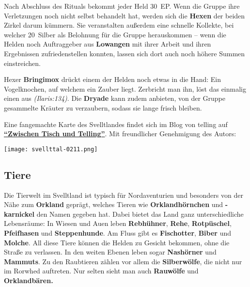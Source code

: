 
Nach Abschluss des Rituals bekommt jeder Held 30~EP.
Wenn die Gruppe ihre Verletzungen noch nicht selbst behandelt hat, werden sich die \textbf{Hexen} der beiden Zirkel darum kümmern.
Sie veranstalten außerdem eine schnelle Kollekte, bei welcher 20~Silber als Belohnung für die Gruppe herauskommen -- wenn die Helden noch Auftraggeber aus \textbf{Lowangen} mit ihrer Arbeit und ihren Ergebnissen zufriedenstellen konnten, lassen sich dort auch noch höhere Summen einstreichen. 
\begin{center}
\end{center}
Hexer \textbf{Bringimox} drückt einem der Helden noch etwas in die Hand:
Ein Vogelknochen, auf welchem ein Zauber liegt. Zerbricht man ihn, löst das einmalig einen  aus \emph{(Ilaris:134)}.
Die \textbf{Dryade} kann zudem anbieten, von der Gruppe gesammelte Kräuter zu verzaubern, sodass sie lange frisch bleiben.

\neueseite

\spaltenende
Eine fangemachte Karte des Svelltlandes findet sich im Blog von telling auf \href{https://tellingaventurien.home.blog/2023/02/27/karte-svelltland-um-1045-nach-bosparans-fall/}{\textbf{\enquote{Zwischen Tisch und Telling}}}. Mit freundlicher Genehmigung des Autors:

\begin{center}
\texttt{[image: svellttal-0211.png]}
\end{center}

\newpage

\spaltenanfang



\subsection[Tiere und Pflanzen]{Tiere}
\label{svellt}
	Die Tierwelt im Svelltland ist typisch für Nordaventurien und besonders von der Nähe zum \textbf{Orkland} geprägt,
welches Tieren wie \textbf{Orklandhörnchen} und \textbf{-karnickel} den Namen gegeben hat.
Dabei bietet das Land ganz unterschiedliche Lebensräume:
In Wiesen und Auen leben \textbf{Rebhühner}, \textbf{Rehe}, \textbf{Rotpüschel}, \textbf{Pfeifhasen} und \textbf{Steppenhunde}.
Am Fluss gibt es \textbf{Fischotter}, \textbf{Biber} und \textbf{Molche}. All diese Tiere können die Helden zu Gesicht bekommen, ohne die Straße zu verlassen. In den weiten Ebenen leben sogar \textbf{Nashörner} und \textbf{Mammuts}.
Zu den Raubtieren zählen vor allem die \textbf{Silberwölfe}, die nicht nur im Rorwhed auftreten. Nur selten sieht man auch \textbf{Rauwölfe} und \textbf{Orklandbären.}

